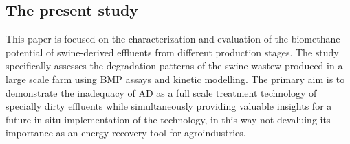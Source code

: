 \subsection{The present study}
This paper is focused on the characterization and evaluation of the biomethane potential of swine-derived effluents from different production stages. The study specifically assesses the degradation patterns of the swine wastew produced in a large scale farm using BMP assays and kinetic modelling. The primary aim is to demonstrate the inadequacy of AD as a full scale treatment technology of specially dirty effluents while simultaneously providing valuable insights for a future in situ implementation of the technology, in this way not devaluing its importance as an energy recovery tool for agroindustries.